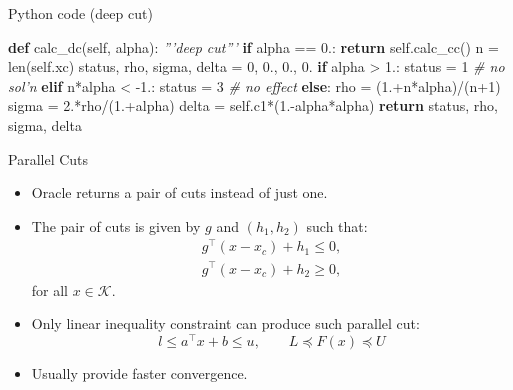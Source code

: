 \documentclass[10pt,ignorenonframetext,serif,onlymath]{beamer}
\newenvironment{Shaded}{}{}
\newcommand{\BuiltInTok}[1]{#1}
\newcommand{\CommentTok}[1]{\textcolor[rgb]{0.38,0.63,0.69}{\textit{#1}}}
\newcommand{\ControlFlowTok}[1]{\textcolor[rgb]{0.00,0.44,0.13}{\textbf{#1}}}
\newcommand{\DecValTok}[1]{\textcolor[rgb]{0.25,0.63,0.44}{#1}}
\newcommand{\FloatTok}[1]{\textcolor[rgb]{0.25,0.63,0.44}{#1}}
\newcommand{\KeywordTok}[1]{\textcolor[rgb]{0.00,0.44,0.13}{\textbf{#1}}}
\newcommand{\NormalTok}[1]{#1}
\newcommand{\OperatorTok}[1]{\textcolor[rgb]{0.40,0.40,0.40}{#1}}
\newcommand{\VariableTok}[1]{\textcolor[rgb]{0.10,0.09,0.49}{#1}}
\begin{document}
\begin{frame}[fragile]{Python code (deep cut)}
\protect\hypertarget{sec:python-code-deep-cut}{}

\begin{Shaded}
\begin{Highlighting}[]
    \KeywordTok{def}\NormalTok{ calc_dc(}\VariableTok{self}\NormalTok{, alpha):}
        \CommentTok{'''deep cut'''}
        \ControlFlowTok{if}\NormalTok{ alpha }\OperatorTok{==} \FloatTok{0.}\NormalTok{: }
            \ControlFlowTok{return} \VariableTok{self}\NormalTok{.calc_cc()}
\NormalTok{        n }\OperatorTok{=} \BuiltInTok{len}\NormalTok{(}\VariableTok{self}\NormalTok{.xc)}
\NormalTok{        status, rho, sigma, delta }\OperatorTok{=} \DecValTok{0}\NormalTok{, }\FloatTok{0.}\NormalTok{, }\FloatTok{0.}\NormalTok{, }\FloatTok{0.}
        \ControlFlowTok{if}\NormalTok{ alpha }\OperatorTok{>} \FloatTok{1.}\NormalTok{:}
\NormalTok{            status }\OperatorTok{=} \DecValTok{1}  \CommentTok{# no sol'n}
        \ControlFlowTok{elif}\NormalTok{ n}\OperatorTok{*}\NormalTok{alpha }\OperatorTok{<} \FloatTok{-1.}\NormalTok{:}
\NormalTok{            status }\OperatorTok{=} \DecValTok{3}  \CommentTok{# no effect}
        \ControlFlowTok{else}\NormalTok{:}
\NormalTok{            rho }\OperatorTok{=}\NormalTok{ (}\FloatTok{1.}\OperatorTok{+}\NormalTok{n}\OperatorTok{*}\NormalTok{alpha)}\OperatorTok{/}\NormalTok{(n}\OperatorTok{+}\DecValTok{1}\NormalTok{)}
\NormalTok{            sigma }\OperatorTok{=} \FloatTok{2.}\OperatorTok{*}\NormalTok{rho}\OperatorTok{/}\NormalTok{(}\FloatTok{1.}\OperatorTok{+}\NormalTok{alpha)}
\NormalTok{            delta }\OperatorTok{=} \VariableTok{self}\NormalTok{.c1}\OperatorTok{*}\NormalTok{(}\FloatTok{1.}\OperatorTok{-}\NormalTok{alpha}\OperatorTok{*}\NormalTok{alpha)}
        \ControlFlowTok{return}\NormalTok{ status, rho, sigma, delta}
\end{Highlighting}
\end{Shaded}

\end{frame}

\begin{frame}{Parallel Cuts}
\protect\hypertarget{sec:parallel-cuts}{}

\begin{itemize}
\item
  Oracle returns a pair of cuts instead of just one.
\item
  The pair of cuts is given by \(g\) and \((h_1, h_2)\) such that:
  \[\begin{array}{l}
  g^\top (x - x_c) + h_1 \leq 0,  \\
  g^\top (x - x_c) + h_2 \geq 0,
  \end{array}\] for all \(x \in \mathcal{K}\).
\item
  Only linear inequality constraint can produce such parallel cut:
  \[ l \leq a^\top x + b \leq u, \qquad L \preceq F(x) \preceq U \]
\item
  Usually provide faster convergence.
\end{itemize}

\end{frame}
\end{document}
